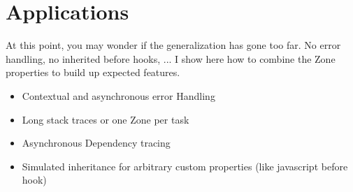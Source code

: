 \section{Applications} %

At this point, you may wonder if the generalization has gone too far. No error handling, no inherited before hooks, ... I show here how to combine the Zone properties to build up expected features.

\begin{itemize}
\item Contextual and asynchronous error Handling
\item Long stack traces or one Zone per task
\item Asynchronous Dependency tracing
\item Simulated inheritance for arbitrary custom properties (like javascript before hook)
\end{itemize}